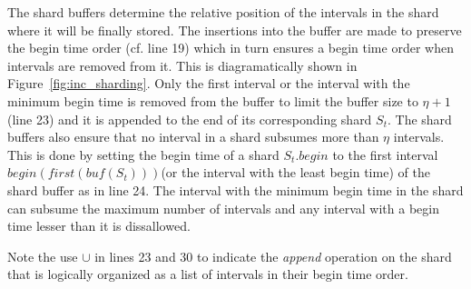 The shard buffers determine the relative position of the intervals in the shard where it will be finally stored. The insertions into the buffer are made to preserve the begin time order (cf. line 19) which in turn ensures a begin time order when intervals are removed from it. This is diagramatically shown in Figure~\ref{fig:inc_sharding}. Only the first interval or the interval with the minimum begin time is removed from the buffer to limit the buffer size to $\eta + 1$ (line 23) and it is appended to the end of its corresponding shard $S_t$. The shard buffers also ensure that no interval in a shard subsumes more than $\eta$ intervals. This is done by setting the begin time of a shard $S_t.begin$ to the first interval $begin(first(bu\!f(S_t)))$(or the interval with the least begin time) of the shard buffer as in line 24. The interval with the minimum begin time in the shard can subsume the maximum number of intervals and any interval with a begin time lesser than it is dissallowed.

Note the use $\cup$ in lines 23 and 30 to indicate the \emph{append} operation on the shard that is logically organized as a list of intervals in their begin time order.



